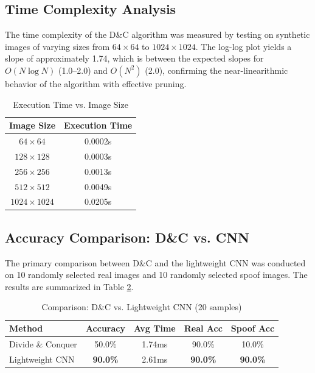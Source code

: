 \documentclass[conference]{IEEEtran}
\begin{document}
\subsection{Time Complexity Analysis}

The time complexity of the D\&C algorithm was measured by testing on synthetic images of varying sizes from $64 \times 64$ to $1024 \times 1024$. The log-log plot yields a slope of approximately 1.74, which is between the expected slopes for $O(N \log N)$ (1.0--2.0) and $O(N^2)$ (2.0), confirming the near-linearithmic behavior of the algorithm with effective pruning.

\begin{table}[htbp]
\centering
\caption{Execution Time vs. Image Size}
\label{tab:complexity}
\begin{tabular}{@{}cc@{}}
\toprule
\textbf{Image Size} & \textbf{Execution Time} \\
\midrule
$64 \times 64$ & 0.0002s \\
$128 \times 128$ & 0.0003s \\
$256 \times 256$ & 0.0013s \\
$512 \times 512$ & 0.0049s \\
$1024 \times 1024$ & 0.0205s \\
\bottomrule
\end{tabular}
\end{table}

\subsection{Accuracy Comparison: D\&C vs. CNN}

The primary comparison between D\&C and the lightweight CNN was conducted on 10 randomly selected real images and 10 randomly selected spoof images. The results are summarized in Table \ref{tab:comparison}.

\begin{table}[htbp]
\centering
\caption{Comparison: D\&C vs. Lightweight CNN (20 samples)}
\label{tab:comparison}
\begin{tabular}{@{}lcccc@{}}
\toprule
\textbf{Method} & \textbf{Accuracy} & \textbf{Avg Time} & \textbf{Real Acc} & \textbf{Spoof Acc} \\
\midrule
Divide \& Conquer & 50.0\% & 1.74ms & 90.0\% & 10.0\% \\
Lightweight CNN & \textbf{90.0\%} & 2.61ms & \textbf{90.0\%} & \textbf{90.0\%} \\
\bottomrule
\end{tabular}
\end{table}
\end{document}
